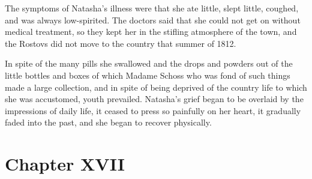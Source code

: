 The symptoms of Natasha's illness were that she ate little, slept
little, coughed, and was always low-spirited. The doctors said
that she could not get on without medical treatment, so they kept
her in the stifling atmosphere of the town, and the Rostovs did
not move to the country that summer of 1812.

In spite of the many pills she swallowed and the drops and
powders out of the little bottles and boxes of which Madame
Schoss who was fond of such things made a large collection, and
in spite of being deprived of the country life to which she was
accustomed, youth prevailed. Natasha's grief began to be overlaid
by the impressions of daily life, it ceased to press so painfully
on her heart, it gradually faded into the past, and she began to
recover physically.


\chapter*{Chapter XVII}
\ifaudio     
{} 
\fi

